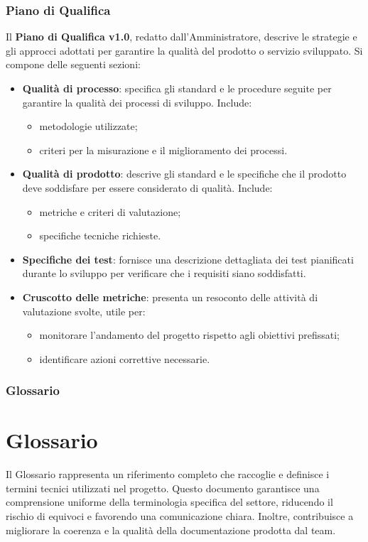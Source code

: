 \subsubsection{Piano di Qualifica}
Il \textbf{Piano di Qualifica v1.0}, redatto dall’Amministratore, descrive le strategie e gli approcci adottati per garantire la qualità del prodotto o servizio sviluppato. Si compone delle seguenti sezioni:
\begin{itemize}
    \item \textbf{Qualità di processo}: specifica gli standard e le procedure seguite per garantire la qualità dei processi di sviluppo. Include:
    \begin{itemize}
        \item metodologie utilizzate;
        \item criteri per la misurazione e il miglioramento dei processi.
    \end{itemize}

    \item \textbf{Qualità di prodotto}: descrive gli standard e le specifiche che il prodotto deve soddisfare per essere considerato di qualità. Include:
    \begin{itemize}
        \item metriche e criteri di valutazione;
        \item specifiche tecniche richieste.
    \end{itemize}

    \item \textbf{Specifiche dei test}: fornisce una descrizione dettagliata dei test pianificati durante lo sviluppo per verificare che i requisiti siano soddisfatti.

    \item \textbf{Cruscotto delle metriche}: presenta un resoconto delle attività di valutazione svolte, utile per:
    \begin{itemize}
        \item monitorare l’andamento del progetto rispetto agli obiettivi prefissati;
        \item identificare azioni correttive necessarie.
    \end{itemize}
\end{itemize}
\subsubsection{Glossario}
\section{Glossario}
Il Glossario rappresenta un riferimento completo che raccoglie e definisce i termini tecnici utilizzati nel progetto. Questo documento garantisce una comprensione uniforme della terminologia specifica del settore, riducendo il rischio di equivoci e favorendo una comunicazione chiara. Inoltre, contribuisce a migliorare la coerenza e la qualità della documentazione prodotta dal team.

